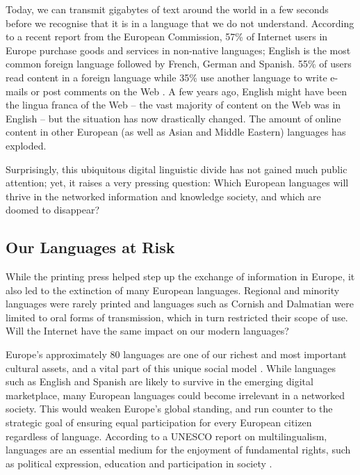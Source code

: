 \begin{multicols}{2}
Today, we can transmit gigabytes of text around the world in a few seconds before we recognise that it is in a language that we do not understand. According to a recent report from the European Commission, 57\% of Internet users in Europe purchase goods and services in non-native languages; English is the most common foreign language followed by French, German and Spanish. 55\% of users read content in a foreign language while 35\% use another language to write e-mails or post comments on the Web \cite{EC1}. A few years ago, English might have been the lingua franca of the Web -- the vast majority of content on the Web was in English -- but the situation has now drastically changed. The amount of online content in other European (as well as Asian and Middle Eastern) languages has exploded.

Surprisingly, this ubiquitous digital linguistic divide has not gained much public attention; yet, it raises a very pressing question: Which European languages will thrive in the networked information and knowledge society, and which are doomed to disappear?

\subsection{Our Languages at Risk}

While the printing press helped step up the exchange of information in Europe, it also led to the extinction of many European languages. Regional and minority languages were rarely printed and languages such as Cornish and Dalmatian were limited to oral forms of transmission, which in turn restricted their scope of use. Will the Internet have the same impact on our modern languages?


Europe’s approximately 80 languages are one of our richest and most important cultural assets, and a vital part of this unique social model \cite{EC2}. While languages such as English and Spanish are likely to survive in the emerging digital marketplace, many European languages could become irrelevant in a networked society. This would weaken Europe’s global standing, and run counter to the strategic goal of ensuring equal participation for every European citizen regardless of language. According to a UNESCO report on multilingualism, languages are an essential medium for the enjoyment of fundamental rights, such as political expression, education and participation in society \cite{Unesco1}.


\end{multicols}

